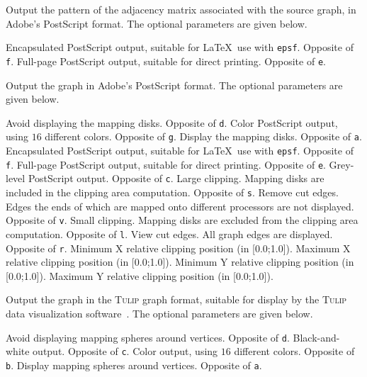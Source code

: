 \begin{itemize}
\begin{itemize}
\begin{itemize}
\iteme[\texttt{m}]
Output the pattern of the adjacency matrix associated with the source graph,
in Adobe's PostScript format. The optional parameters are given below.
\begin{itemize}
\iteme[\texttt{e}]
Encapsulated PostScript output, suitable for \LaTeX\ use with \texttt{epsf}.
Opposite of \texttt{f}.
\iteme[\texttt{f}]
Full-page PostScript output, suitable for direct printing.
Opposite of \texttt{e}.
\end{itemize}
\iteme[\texttt{p}]
Output the graph in Adobe's PostScript format.
The optional parameters are given below.
\begin{itemize}
\iteme[\texttt{a}]
Avoid displaying the mapping disks. Opposite of \texttt{d}.
\iteme[\texttt{c}]
Color PostScript output, using $16$ different colors. Opposite of \texttt{g}.
\iteme[\texttt{d}]
Display the mapping disks. Opposite of \texttt{a}.
\iteme[\texttt{e}]
Encapsulated PostScript output, suitable for \LaTeX\ use with \texttt{epsf}.
Opposite of \texttt{f}.
\iteme[\texttt{f}]
Full-page PostScript output, suitable for direct printing.
Opposite of \texttt{e}.
\iteme[\texttt{g}]
Grey-level PostScript output. Opposite of \texttt{c}.
\iteme[\texttt{l}]
Large clipping. Mapping disks are included in the clipping area computation.
Opposite of \texttt{s}.
\iteme[\texttt{r}]
Remove cut edges. Edges the ends of which are mapped onto different
processors are not displayed.
Opposite of \texttt{v}.
\iteme[\texttt{s}]
Small clipping. Mapping disks are excluded from the clipping area computation.
Opposite of \texttt{l}.
\iteme[\texttt{v}]
View cut edges. All graph edges are displayed.
Opposite of \texttt{r}.
\iteme[\texttt{x=}{\it val}]
Minimum X relative clipping position (in [0.0;1.0]).
\iteme[\texttt{X=}{\it val}]
Maximum X relative clipping position (in [0.0;1.0]).
\iteme[\texttt{y=}{\it val}]
Minimum Y relative clipping position (in [0.0;1.0]).
\iteme[\texttt{Y=}{\it val}]
Maximum Y relative clipping position (in [0.0;1.0]).
\end{itemize}
\iteme[\texttt{t}]
Output the graph in the \textsc{Tulip} graph format, suitable for
display by the \textsc{Tulip} data visualization
software~\cite{tulip}. The optional parameters are given below.
\begin{itemize}
\iteme[\texttt{a}]
Avoid displaying mapping spheres around vertices. Opposite of \texttt{d}.
\iteme[\texttt{b}]
Black-and-white output. Opposite of \texttt{c}.
\iteme[\texttt{c}]
Color output, using $16$ different colors. Opposite of \texttt{b}.
\iteme[\texttt{d}]
Display mapping spheres around vertices. Opposite of \texttt{a}.

\end{itemize}
\end{itemize}
\end{itemize}
\end{itemize}
